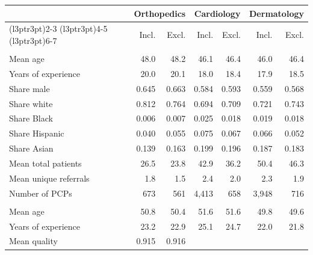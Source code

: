 
\begin{tabular}{lrrrrrr}
\toprule
\multicolumn{1}{c}{ } & \multicolumn{2}{c}{Orthopedics} & \multicolumn{2}{c}{Cardiology} & \multicolumn{2}{c}{Dermatology} \\
\cmidrule(l{3pt}r{3pt}){2-3} \cmidrule(l{3pt}r{3pt}){4-5} \cmidrule(l{3pt}r{3pt}){6-7}
  & Incl. & Excl. & Incl. & Excl. & Incl. & Excl.\\
\midrule
\addlinespace[0.3em]
\multicolumn{7}{l}{\textbf{Panel A: PCPs}}\\
\hspace{1em}Mean age & 48.0 & 48.2 & 46.1 & 46.4 & 46.0 & 46.4\\
\hspace{1em}Years of experience & 20.0 & 20.1 & 18.0 & 18.4 & 17.9 & 18.5\\
\hspace{1em}Share male & 0.645 & 0.663 & 0.584 & 0.593 & 0.559 & 0.568\\
\hspace{1em}Share white & 0.812 & 0.764 & 0.694 & 0.709 & 0.721 & 0.743\\
\hspace{1em}Share Black & 0.006 & 0.007 & 0.025 & 0.018 & 0.019 & 0.018\\
\hspace{1em}Share Hispanic & 0.040 & 0.055 & 0.075 & 0.067 & 0.066 & 0.052\\
\hspace{1em}Share Asian & 0.139 & 0.163 & 0.199 & 0.196 & 0.187 & 0.183\\
\hspace{1em}Mean total patients & 26.5 & 23.8 & 42.9 & 36.2 & 50.4 & 46.3\\
\hspace{1em}Mean unique referrals & 1.8 & 1.5 & 2.4 & 2.0 & 2.3 & 1.9\\
\hspace{1em}Number of PCPs & 673 & 561 & 4,413 & 658 & 3,948 & 716\\
\addlinespace[0.3em]
\multicolumn{7}{l}{\textbf{Panel B: Specialists}}\\
\hspace{1em}Mean age & 50.8 & 50.4 & 51.6 & 51.6 & 49.8 & 49.6\\
\hspace{1em}Years of experience & 23.2 & 22.9 & 25.1 & 24.7 & 22.0 & 21.8\\
\hspace{1em}Mean quality & 0.915 & 0.916 &  &  &  & \\

\end{tabular}
